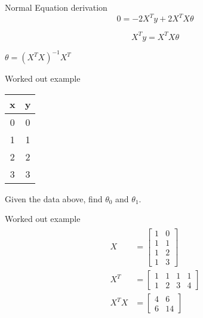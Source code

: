 \documentclass{beamer}
\begin{document}
\begin{frame}{Normal Equation derivation}
$$
    0 = -2X^{T}y + 2X^{T}X\theta
$$

$$
    X^{T}y  = X^{T}X\theta
$$

\begin{tcolorbox}
\begin{center}
    

        $\theta = (X^{T}X)^{-1}X^{T}$
\end{center}
\end{tcolorbox}

\end{frame}

\begin{frame}{Worked out example}
    \begin{center}
 \begin{tabular}{||c c||} 
 \hline
 x  & y \\ [0.5ex] 
 \hline\hline
 0 & 0 \\
 1 & 1 \\
 2 & 2 \\
 3 & 3 \\
 \hline
\end{tabular}
\end{center}
\end{frame}


Given the data above, find $\theta_{0}$ and $\theta_{1}$.
\begin{frame}{Worked out example}
\begin{align}
    \begin{split}
        X &= \begin{bmatrix}
            1 & 0\\
            1 & 1\\
            1 & 2\\
            1 & 3
        \end{bmatrix}\\
        X^{T} &= \begin{bmatrix}
            1&1&1&1\\
            1&2&3&4
        \end{bmatrix}\\
        X^{T}X &= \begin{bmatrix}
            4 &6\\6&14
        \end{bmatrix}
    \end{split}
\end{align}
    
\end{frame}
\end{document}
